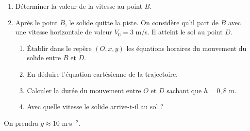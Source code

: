 \documentclass[11pt]{article}
\begin{document}
\begin{enumerate}
  \item Déterminer la valeur de la vitesse au point $B$.
  \item Après le point $B$, le solide quitte la piste. On considère qu'il part de $B$ avec une vitesse horizontale de valeur $V_0 = 3$ m/s. Il atteint le sol au point $D$.
  \begin{enumerate}[label=\alph*.]
    \item Établir dans le repère $(O, x, y)$ les équations horaires du mouvement du solide entre $B$ et $D$.
    \item En déduire l'équation cartésienne de la trajectoire.
    \item Calculer la durée du mouvement entre $O$ et $D$ sachant que $h = 0{,}8$ m.
    \item Avec quelle vitesse le solide arrive-t-il au sol ?
  \end{enumerate}
\end{enumerate}
\noindent On prendra $g \approx 10$ m$\cdot$s$^{-2}$.
\end{document}
